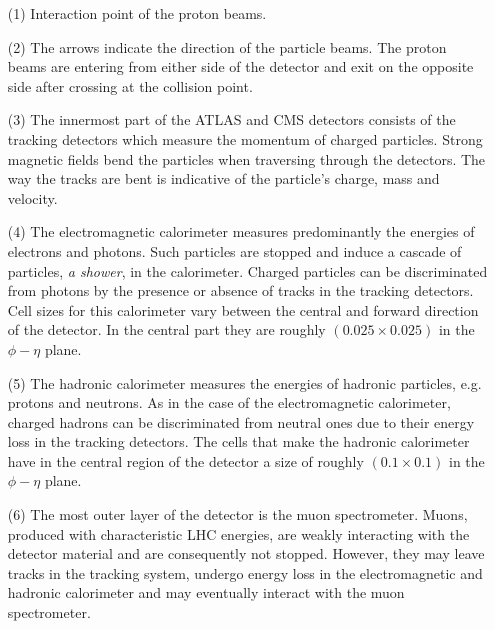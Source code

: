 \begin{itemize}
\item[(1)] Interaction point of the proton beams.
\item[(2)] The arrows indicate the direction of the particle beams. The proton beams are entering from either side of the detector and exit on the opposite side after crossing at the collision point.
\item[(3)] The innermost part of the ATLAS and CMS detectors consists of the tracking detectors which measure the momentum of charged particles. Strong magnetic fields bend the particles when traversing through the detectors. The way the tracks are bent is indicative of the particle's charge, mass and velocity.
\item[(4)] The electromagnetic calorimeter measures predominantly the energies of electrons and photons. Such particles are stopped and induce a cascade of particles, \emph{a shower}, in the calorimeter. Charged particles can be discriminated from photons by the presence or absence of tracks in the tracking detectors. Cell sizes for this calorimeter vary between the central and forward direction of the detector. In the central part they are roughly $(0.025 \times 0.025)$ in the $\phi-\eta$ plane.
\item[(5)] The hadronic calorimeter measures the energies of hadronic particles, e.g. protons and neutrons. As in the case of the electromagnetic calorimeter, charged hadrons can be discriminated from neutral ones due to their energy loss in the tracking detectors. The cells that make the hadronic calorimeter have in the central region of the detector a size of roughly $(0.1 \times 0.1)$ in the $\phi-\eta$ plane.
\item[(6)] The most outer layer of the detector is the muon spectrometer. Muons, produced with characteristic LHC energies, are weakly interacting with the detector material and are consequently not stopped. However, they may leave tracks in the tracking system, undergo energy loss in the electromagnetic and hadronic calorimeter and may eventually interact with the muon spectrometer. 
\end{itemize}

